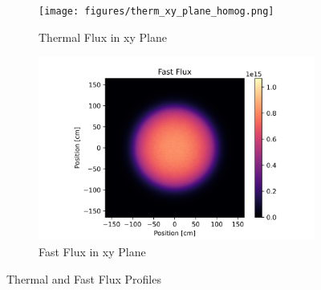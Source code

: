 \begin{figure}[h!]
\centering

\begin{subfigure}{0.6\textwidth}
  \texttt{[image: figures/therm\_xy\_plane\_homog.png]}
  \caption{Thermal Flux in xy Plane}
  \label{fig:hom-plane-therm}
\end{subfigure}%
%
\begin{subfigure}{0.6\textwidth}
  \includegraphics[width=0.95\linewidth]{figures/fast_xy_plane_homog.png}
  \caption{Fast Flux in xy Plane}
  \label{fig:hom-plane-fast}
\end{subfigure}

%
\caption{Thermal and Fast Flux Profiles}
\label{fig:hom-det-plane}
\end{figure}